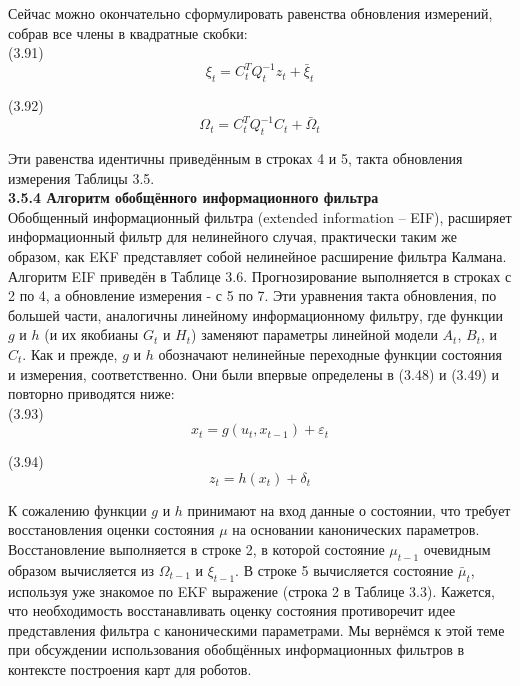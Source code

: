 \documentclass[10pt,a4paper]{article}
\begin{document}
Сейчас можно окончательно сформулировать равенства обновления измерений, собрав все члены в квадратные скобки:\\

(3.91)
$$\xi_t=C_t^T Q_t^{-1}z_t+\bar{\xi}_t$$

(3.92)
$$\varOmega_t=C_t^T Q_t^{-1}C_t+\bar{\varOmega}_t$$

Эти равенства идентичны приведённым в строках 4 и 5, такта обновления измерения Таблицы 3.5.\\

\textbf{3.5.4 Алгоритм обобщённого информационного фильтра}\\

Обобщенный информационный фильтра (extended information – EIF), расширяет информационный фильтр для нелинейного случая, практически таким же образом, как EKF представляет собой нелинейное расширение фильтра Калмана. Алгоритм EIF приведён в Таблице 3.6. Прогнозирование выполняется в строках с 2 по 4, а обновление измерения - с 5 по 7. Эти уравнения такта обновления, по большей части, аналогичны линейному информационному фильтру, где функции $g$ и $h$ (и их якобианы $G_t$ и $H_t$) заменяют параметры линейной модели $A_t$, $B_t$, и $C_t$. Как и прежде, $g$ и $h$ обозначают нелинейные переходные функции состояния и измерения, соответственно. Они были впервые определены в (3.48) и (3.49) и повторно приводятся ниже:\\

(3.93)
$$x_t=g(u_t,x_{t-1})+\varepsilon_t$$

(3.94)
$$z_t=h(x_t)+\delta_t$$

К сожалению функции $g$ и $h$ принимают на вход данные о состоянии, что требует восстановления оценки состояния $\mu$ на основании канонических параметров. Восстановление выполняется в строке 2, в которой состояние $\mu_{t-1}$ очевидным образом вычисляется из $\varOmega_{t-1}$ и $\xi_{t-1}$. В строке 5 вычисляется состояние $\bar{\mu}_t$, используя уже знакомое по EKF выражение (строка 2 в Таблице 3.3). Кажется, что необходимость восстанавливать оценку состояния противоречит идее представления фильтра с каноническими параметрами. Мы вернёмся к этой теме при обсуждении использования обобщённых информационных фильтров в контексте построения карт для роботов.\\
 
\end{document}
